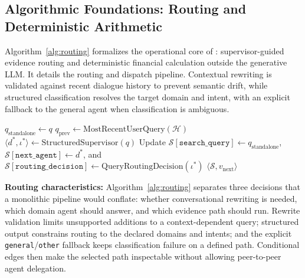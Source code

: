 \subsection{Algorithmic Foundations: Routing and Deterministic Arithmetic}
\label{sec:algorithms}

Algorithm~\ref{alg:routing} formalizes the operational core of \system{}: supervisor-guided evidence routing and deterministic financial calculation outside the generative LLM. It details the routing and dispatch pipeline. Contextual rewriting is validated against recent dialogue history to prevent semantic drift, while structured classification resolves the target domain and intent, with an explicit fallback to the general agent when classification is ambiguous.

\begin{algorithm}[H]
\footnotesize
\SetAlFnt{\footnotesize}
\SetAlCapFnt{\footnotesize}
\SetAlCapNameFnt{\footnotesize}
\SetAlgoVlined
\LinesNumbered
\caption{Supervisor Routing and Conditional Evidence-Path Dispatch}
\label{alg:routing}
$q_{\text{standalone}} \leftarrow q$\;
$q_{\mathrm{prev}} \leftarrow \mathrm{MostRecentUserQuery}(\mathcal{H})$\;
$\langle d^*, \iota^* \rangle \leftarrow \mathrm{StructuredSupervisor}(q)$\;
Update $\mathcal{S}[\texttt{search\_query}] \leftarrow q_{\text{standalone}}$, $\mathcal{S}[\texttt{next\_agent}] \leftarrow d^*$, and $\mathcal{S}[\texttt{routing\_decision}] \leftarrow \mathrm{QueryRoutingDecision}(\iota^*)$\;
\Return $\langle \mathcal{S}, v_{\text{next}} \rangle$\;
\end{algorithm}

\textbf{Routing characteristics:}
Algorithm~\ref{alg:routing} separates three decisions that a monolithic pipeline would conflate: whether conversational rewriting is needed, which domain agent should answer, and which evidence path should run. Rewrite validation limits unsupported additions to a context-dependent query; structured output constrains routing to the declared domains and intents; and the explicit \texttt{general}/\texttt{other} fallback keeps classification failure on a defined path. Conditional edges then make the selected path inspectable without allowing peer-to-peer agent delegation.

